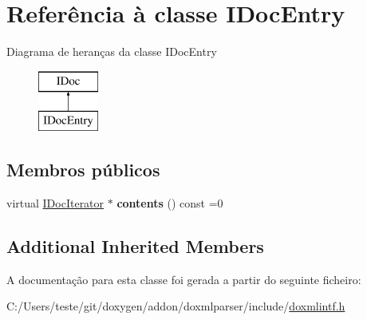 \hypertarget{class_i_doc_entry}{\section{Referência à classe I\-Doc\-Entry}
\label{class_i_doc_entry}
}
Diagrama de heranças da classe I\-Doc\-Entry\begin{figure}[H]
\begin{center}
\leavevmode
\includegraphics[height=2.000000cm]{class_i_doc_entry}
\end{center}
\end{figure}
\subsection*{Membros públicos}
\begin{DoxyCompactItemize}
\item 
\hypertarget{class_i_doc_entry_aff89b69139ea695b04d666fe2c1f963b}{virtual \hyperlink{class_i_doc_iterator}{I\-Doc\-Iterator} $\ast$ {\bfseries contents} () const =0}\label{class_i_doc_entry_aff89b69139ea695b04d666fe2c1f963b}

\end{DoxyCompactItemize}
\subsection*{Additional Inherited Members}


A documentação para esta classe foi gerada a partir do seguinte ficheiro\-:\begin{DoxyCompactItemize}
\item 
C\-:/\-Users/teste/git/doxygen/addon/doxmlparser/include/\hyperlink{include_2doxmlintf_8h}{doxmlintf.\-h}\end{DoxyCompactItemize}
